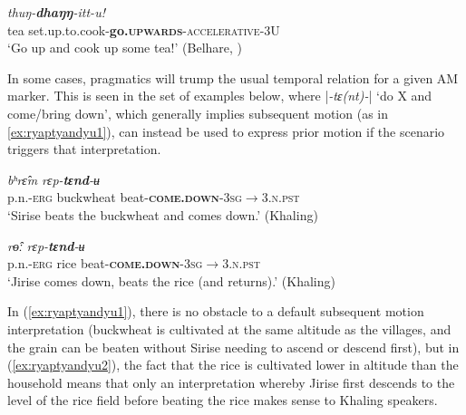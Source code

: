 \documentclass[oneside,a4paper,11pt]{article}
\newcommand{\ipa}[1]{{\phon\textit{#1}}}
\newcommand{\sens}[1]{‘#1’}
\newcommand{\rouge}[1]{\textbf{#1}}
\newcommand{\dhatu}[2]{|\ipa{#1}| `#2'}
\begin{document}
 \begin{exe}
\ex \label{ex:thuNdhaNNittu}
 \gll   \ipa{cia}	\ipa{thuŋ-\rouge{dhaŋŋ}-itt-u!} \\
 tea set.up.to.cook-\rouge{go.\textsc{upwards}}-\textsc{accelerative}-3U \\
\glt \sens{Go up and cook up some tea!} (Belhare, \citealt[73]{bickel99spatial})
 \end{exe}

In some cases, pragmatics will trump the usual temporal relation for a given AM marker.  This is seen in the set of examples below, where  \dhatu{-tɛ(nt)-}{do X and come/bring down}, which  generally implies subsequent motion (as in \ref{ex:ryaptyandyu1}), can instead be used to express prior motion if the scenario triggers that interpretation.  

 \begin{exe}
\ex \label{ex:ryaptyandyu1}
  \gll   \ipa{siriseʔ-ɛ} \ipa{bʰrɛ̂m}  \ipa{rɛp-\rouge{tɛnd}-ʉ} \\
   p.n.-\textsc{erg} buckwheat beat-\textsc{\rouge{come.down}}-\textsc{3sg$\rightarrow$3.n.pst} \\
\glt `Sirise beats the buckwheat and comes down.'  (Khaling)
 \end{exe}
 
 
 \begin{exe}
\ex \label{ex:ryaptyandyu2}
 \gll   \ipa{dzirise-ʔɛ} \ipa{rɵ̂ː} \ipa{rɛp-\rouge{tɛnd}-ʉ} \\
 p.n.-\textsc{erg} rice beat-\textsc{\rouge{come.down}}-\textsc{3sg$\rightarrow$3.n.pst} \\
\glt `Jirise comes down, beats the rice (and returns).'  (Khaling)
 \end{exe}

In (\ref{ex:ryaptyandyu1}), there is no obstacle to a default subsequent motion interpretation (buckwheat is cultivated at the same altitude as the villages, and the grain can be beaten without Sirise needing to ascend or descend first), but in (\ref{ex:ryaptyandyu2}), the fact that the rice is cultivated lower in altitude than the household means that only an interpretation whereby Jirise first descends to the level of the rice field before beating the rice makes sense to Khaling speakers. 

\end{document}

